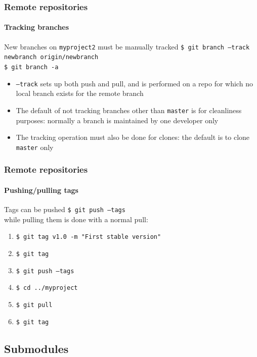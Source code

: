 \begin{frame}
\frametitle{Remote repositories}
\framesubtitle{Tracking branches}

\begin{block}{New branches on \texttt{myproject2} must be manually tracked}
\texttt{\$ git branch ---track newbranch origin/newbranch} \\
\texttt{\$ git branch -a} \\
\begin{itemize}
\item \texttt{---track} sets up both push and pull, and is performed on a repo for which no local branch exists for the remote branch
\item The default of not tracking branches other than \texttt{master} is for cleanliness purposes: normally a branch is maintained by one developer only
\item The tracking operation must also be done for clones: the default is to clone \texttt{master} only
\end{itemize}
\end{block}

\end{frame}

\begin{frame}
\frametitle{Remote repositories}
\framesubtitle{Pushing/pulling tags}

\begin{block}{Tags can be pushed}
\texttt{\$ git push ---tags} \\

\medskip
while pulling them is done with a normal pull:

\begin{enumerate}
\item \texttt{\$ git tag v1.0 -m "First stable version"}
\item \texttt{\$ git tag}
\item \texttt{\$ git push ---tags}
\item \texttt{\$ cd ../myproject}
\item \texttt{\$ git pull}
\item \texttt{\$ git tag}
\end{enumerate}
\end{block}

\end{frame}

\subsection{Submodules}

